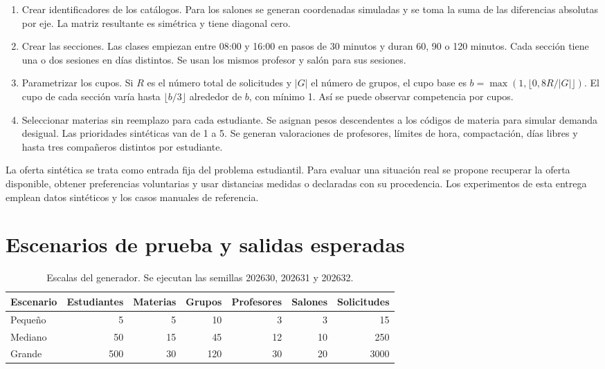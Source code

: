 \documentclass[11pt]{article}
\numberwithin{equation}{section}
\numberwithin{figure}{section}
\numberwithin{table}{section}
\theoremstyle{definition}
\begin{document}
\begin{enumerate}
  \item Crear identificadores de los catálogos. Para los salones se generan
        coordenadas simuladas y se toma la suma de las diferencias absolutas
        por eje. La matriz resultante es simétrica y tiene diagonal cero.
  \item Crear las secciones. Las clases empiezan entre 08:00 y 16:00 en
        pasos de 30 minutos y duran 60, 90 o 120 minutos. Cada sección tiene
        una o dos sesiones en días distintos. Se usan los mismos profesor
        y salón para sus sesiones.
  \item Parametrizar los cupos. Si $R$ es el número total de solicitudes y
        $|G|$ el número de grupos, el cupo base es
        $b=\max(1,\lfloor 0{,}8R/|G|\rfloor)$. El cupo de cada sección
        varía hasta $\lfloor b/3\rfloor$ alrededor de $b$, con mínimo 1.
        Así se puede observar competencia por cupos.
  \item Seleccionar materias sin reemplazo para cada estudiante. Se
        asignan pesos descendentes a los códigos de materia para simular
        demanda desigual. Las prioridades sintéticas van de 1 a 5. Se
        generan valoraciones de profesores, límites de hora, compactación,
        días libres y hasta tres compañeros distintos por estudiante.
\end{enumerate}

La oferta sintética se trata como entrada fija del problema estudiantil.
Para evaluar una situación real se propone recuperar la oferta disponible,
obtener preferencias voluntarias y usar distancias medidas o declaradas con su
procedencia. Los experimentos de esta entrega emplean datos sintéticos y
los casos manuales de referencia.

\section{Escenarios de prueba y salidas esperadas}

\begin{table}[H]
\centering
\caption{Escalas del generador. Se ejecutan las semillas 202630, 202631 y 202632.}
\small
\begin{tabular}{lrrrrrr}
\toprule
Escenario & Estudiantes & Materias & Grupos & Profesores & Salones & Solicitudes \\
\midrule
Pequeño & 5 & 5 & 10 & 3 & 3 & 15 \\
Mediano & 50 & 15 & 45 & 12 & 10 & 250 \\
Grande & 500 & 30 & 120 & 30 & 20 & 3000 \\
\bottomrule
\end{tabular}
\end{table}
\end{document}
